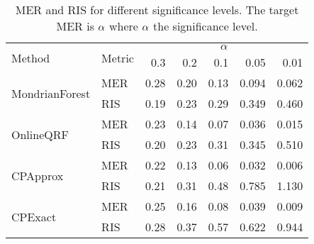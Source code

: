 \begin{table}
	\centering
	\begin{tabular}{ll r r r r r}
		\toprule
		\multirow{2}{*}{Method} &  \multirow{2}{*}{Metric} &  \multicolumn{5}{c}{$\alpha$} \\
		\cmidrule(lr){3-7}
		& & 0.3 &   0.2 &   0.1 &   0.05 &   0.01 \\
		\midrule
		\multirow{2}{*}{MondrianForest}   & MER  & 0.28 & 0.20 & 0.13 &  0.094 &  0.062 \\
		& RIS  &  0.19 &  0.23 &  0.29 &   0.349 &   0.460 \\
		\midrule
		\multirow{2}{*}{OnlineQRF} & MER & 0.23 & 0.14 & 0.07 &  0.036 &  0.015 \\
		& RIS &  0.20 &  0.23 &  0.31 &   0.345 &   0.510 \\
		\midrule
		\multirow{2}{*}{CPApprox} & MER  & 0.22 & 0.13 & 0.06 &  0.032 &  0.006 \\
		& RIS &   0.21 &   0.31 &   0.48 &   0.785 &    1.130 \\
		\midrule
		\multirow{2}{*}{CPExact} & MER  & 0.25 & 0.16 & 0.08 &  0.039 &  0.009 \\
		& RIS &   0.28 &   0.37 &   0.57 &   0.622 &   0.944 \\
		\bottomrule
	\end{tabular}
	\caption{MER and RIS for different significance levels. The target MER is
		$\alpha$ where $\alpha$ the significance level.}
	\label{tab:uncertain-significance}
\end{table}

